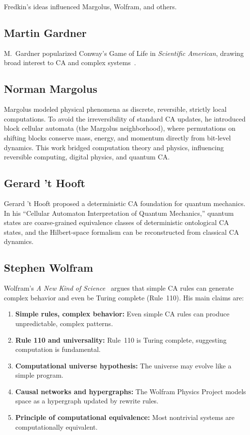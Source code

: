 \documentclass{ijuc}
\begin{document}
Fredkin's ideas influenced Margolus, Wolfram, and others.

\subsection*{Martin Gardner}
M.~Gardner popularized Conway's Game of Life in \emph{Scientific American}, drawing broad interest to CA and complex systems~\cite{gardner1970}.

\subsection*{Norman Margolus}
Margolus \cite{margolus} modeled physical phenomena as discrete, reversible, strictly local computations. To avoid the irreversibility of standard CA updates, he introduced block cellular automata (the Margolus neighborhood), where permutations on shifting blocks conserve mass, energy, and momentum directly from bit-level dynamics. This work bridged computation theory and physics, influencing reversible computing, digital physics, and quantum CA.

\subsection*{Gerard 't Hooft}
Gerard 't Hooft \cite{thooft} proposed a deterministic CA foundation for quantum mechanics. In his ``Cellular Automaton Interpretation of Quantum Mechanics,'' quantum states are coarse-grained equivalence classes of deterministic ontological CA states, and the Hilbert-space formalism can be reconstructed from classical CA dynamics.

\subsection*{Stephen Wolfram}
Wolfram's \emph{A New Kind of Science}~\cite{wolfram} argues that simple CA rules can generate complex behavior and even be Turing complete (Rule~110). His main claims are:
\begin{enumerate}
  \item \textbf{Simple rules, complex behavior:} Even simple CA rules can produce unpredictable, complex patterns.
  \item \textbf{Rule 110 and universality:} Rule~110 is Turing complete, suggesting computation is fundamental.
  \item \textbf{Computational universe hypothesis:} The universe may evolve like a simple program.
  \item \textbf{Causal networks and hypergraphs:} The Wolfram Physics Project \cite{wolfram2020physics} models space as a hypergraph updated by rewrite rules.
  \item \textbf{Principle of computational equivalence:} Most nontrivial systems are computationally equivalent.
\end{enumerate}
\end{document}
